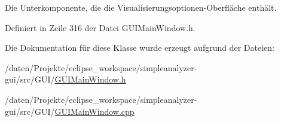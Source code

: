 Die Unterkomponente, die die Visualisierungsoptionen-\/\-Oberfläche enthält. 



Definiert in Zeile 316 der Datei G\-U\-I\-Main\-Window.\-h.



Die Dokumentation für diese Klasse wurde erzeugt aufgrund der Dateien\-:\begin{DoxyCompactItemize}
\item 
/daten/\-Projekte/eclipse\-\_\-workspace/simpleanalyzer-\/gui/src/\-G\-U\-I/\hyperlink{GUIMainWindow_8h}{G\-U\-I\-Main\-Window.\-h}\item 
/daten/\-Projekte/eclipse\-\_\-workspace/simpleanalyzer-\/gui/src/\-G\-U\-I/\hyperlink{GUIMainWindow_8cpp}{G\-U\-I\-Main\-Window.\-cpp}\end{DoxyCompactItemize}

